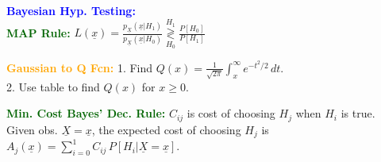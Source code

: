 \documentclass[5pt]{extarticle} %
\begin{document}
\begin{paracol}{3}
{    %

    \textcolor{blue}{\textbf{Bayesian Hyp. Testing:}} \\
    \textcolor{darkgreen}{\textbf{MAP Rule:}} $L(\underline{x}) = \frac{p_{\underline{X}} (\underline{x} | H_1)}{p_{\underline{X}} (\underline{x} | H_0)} \overset{H_1}{\underset{H_0}{\gtrless}} \frac{P[H_0]}{P[H_1]}$ 
    
    

    \textcolor{orange}{\textbf{Gaussian to Q Fcn:}} 1. Find $Q(x) = \frac{1}{\sqrt{2\pi}} \int_x^\infty e^{-t^2/2} \, dt$. \\
    2. Use table to find $Q(x)$ for $x \geq 0$. 

    \textcolor{darkgreen}{\textbf{Min. Cost Bayes' Dec. Rule:}} $C_{ij}$ is cost of choosing $H_j$ when $H_i$ is true. Given obs. $\underline{X} = \underline{x}$, the expected cost of choosing $H_j$ is $A_j (\underline{x}) = \sum_{i=0}^1 C_{ij} \, P[H_i | \underline{X} = \underline{x}]$. 
    

}
\end{paracol}
\end{document}
